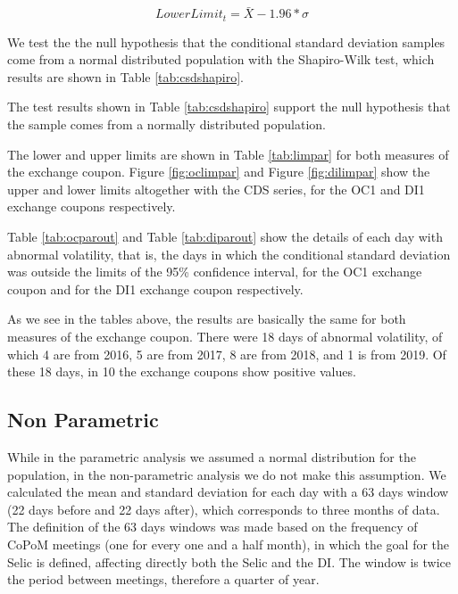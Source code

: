 \documentclass[cic,tc, english]{iiufrgs}
\begin{document}
    \begin{equation}
        \label{eqn:lop}
        LowerLimit_t = \bar{X} - 1.96 * \sigma
    \end{equation}

    We test the the null hypothesis that the conditional standard deviation samples come from a normal distributed population with the Shapiro-Wilk test, which results are shown in Table \ref{tab:csdshapiro}.

    

    The test results shown in Table \ref{tab:csdshapiro} support the null hypothesis that the sample comes from a normally distributed population.

    The lower and upper limits are shown in Table \ref{tab:limpar} for both measures of the exchange coupon. Figure \ref{fig:oclimpar} and Figure \ref{fig:dilimpar} show the upper and lower limits altogether with the CDS series, for the OC1 and DI1 exchange coupons respectively.

    

    

    

    Table \ref{tab:ocparout} and Table \ref{tab:diparout} show the details of each day with abnormal volatility, that is, the days in which the conditional standard deviation was outside the limits of the 95\% confidence interval, for the OC1 exchange coupon and for the DI1 exchange coupon respectively.

    

    

    As we see in the tables above, the results are basically the same for both measures of the exchange coupon. There were 18 days of abnormal volatility, of which 4 are from 2016, 5 are from 2017, 8 are from 2018, and 1 is from 2019. Of these 18 days, in 10 the exchange coupons show positive values.


\subsection{Non Parametric}

    While in the parametric analysis we assumed a normal distribution for the population, in the non-parametric analysis we do not make this assumption. We calculated the mean and standard deviation for each day with a 63 days window (22 days before and 22 days after), which corresponds to three months of data. The definition of the 63 days windows was made based on the frequency of CoPoM meetings (one for every one and a half month), in which the goal for the Selic is defined, affecting directly both the Selic and the DI. The window is twice the period between meetings, therefore a quarter of year.
\end{document}

